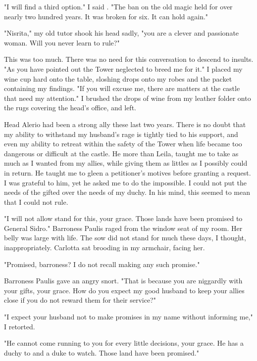 \documentclass{article}
\begin{document}
"I will find a third option." I said . "The ban on the old magic held for over nearly two hundred years. It was broken for six. It can hold again."

"Nisrita," my old tutor shook his head sadly, "you are a clever and passionate woman. Will you never learn to rule?"

This was too much. There was no need for this conversation to descend to insults. "As you have pointed out the Tower neglected to breed me for it." I placed my wine cup hard onto the table, sloshing drops onto my robes and the packet containing my findings. "If you will excuse me, there are matters at the castle that need my attention." I brushed the drops of wine from my leather folder onto the rugs covering the head's office, and left.

Head Alerio had been a strong ally these last two years. There is no doubt that my ability to withstand my husband's rage is tightly tied to his support, and even my ability to retreat within the safety of the Tower when life became too dangerous or difficult at the castle. He more than Leila, taught me to take as much as I wanted from my allies, while giving them as littles as I possibly could in return. He taught me to gleen a petitioner's motives before granting a request. I was grateful to him, yet he asked me to do the impossible. I could not put the needs of the gifted over the needs of my duchy. In his mind, this seemed to mean that I could not rule.

\vspace{.5cm}

"I will not allow stand for this, your grace. Those lands have been promised to General Sidro." Barroness Paulis raged from the window seat of my room. Her belly was large with life. The sow did not stand for much these days, I thought, inappropriately. Carlotta sat brooding in my armchair, facing her.

"Promised, barroness? I do not recall making any such promise."

Barroness Paulis gave an angry snort. "That is because you are niggardly with your gifts, your grace. How do you expect my good husband to keep your allies close if you do not reward them for their service?"

"I expect your husband not to make promises in my name without informing me," I retorted. 

"He cannot come running to you for every little decisions, your grace. He has a duchy to and a duke to watch. Those land have been promised."
\end{document}
